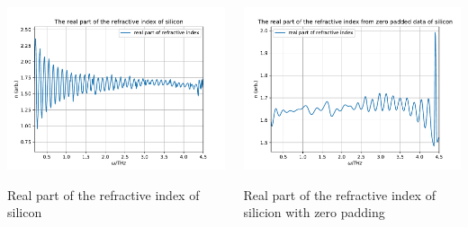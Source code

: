 \documentclass[aspectratio=1610, 9pt]{beamer}
\begin{document}
\begin{frame}
  \begin{center}
    \begin{columns}
      \begin{column}
        \includegraphics[width=\textwidth]{silicon/THz_real_index.pdf}
        \caption{Real part of the refractive index of silicon}
      \end{column}
      \begin{column}
        \includegraphics[width=\textwidth]{silicon/THz_real_index_zero.pdf}
        \caption{Real part of the refractive index of silicion with zero padding}
      \end{column}
    \end{columns}
  \end{center}
\end{frame}
\end{document}
